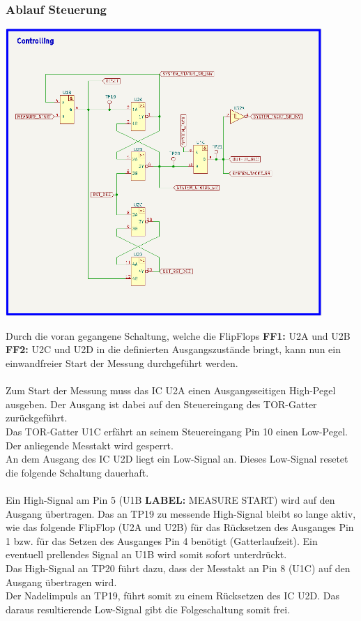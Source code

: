 \newpage
\subsubsection{Ablauf Steuerung}

\begin{center}
\includegraphics[width=12cm]{Bilder/Controlling.png}
\end{center}

Durch die voran gegangene Schaltung, welche die FlipFlops \textbf{FF1:} U2A und U2B \textbf{FF2:} U2C und U2D in die definierten Ausgangszustände bringt, kann nun ein einwandfreier Start der Messung durchgeführt werden. 
\\
\\
Zum Start der Messung muss das IC U2A einen Ausgangsseitigen High-Pegel ausgeben. Der Ausgang ist dabei auf den Steuereingang des TOR-Gatter zurückgeführt.
\\
Das TOR-Gatter U1C erfährt an seinem Steuereingang Pin 10 einen Low-Pegel. Der anliegende Messtakt wird gesperrt.
\\
An dem Ausgang des IC U2D liegt ein Low-Signal an. Dieses Low-Signal resetet die folgende Schaltung dauerhaft.  
\\
\\
Ein High-Signal am Pin 5 (U1B \textbf{LABEL:} MEASURE START) wird auf den Ausgang übertragen. Das an TP19 zu messende High-Signal bleibt so lange aktiv, wie das folgende FlipFlop (U2A und U2B) für das Rücksetzen des Ausganges Pin 1 bzw. für das Setzen des Ausganges Pin 4 benötigt (Gatterlaufzeit). Ein eventuell prellendes Signal an U1B wird somit sofort unterdrückt.
\\
Das High-Signal an TP20 führt dazu, dass der Messtakt an Pin 8 (U1C) auf den Ausgang übertragen wird. 
\\ 
Der Nadelimpuls an TP19, führt somit zu einem Rücksetzen des IC U2D. Das daraus resultierende Low-Signal gibt die Folgeschaltung somit frei.

